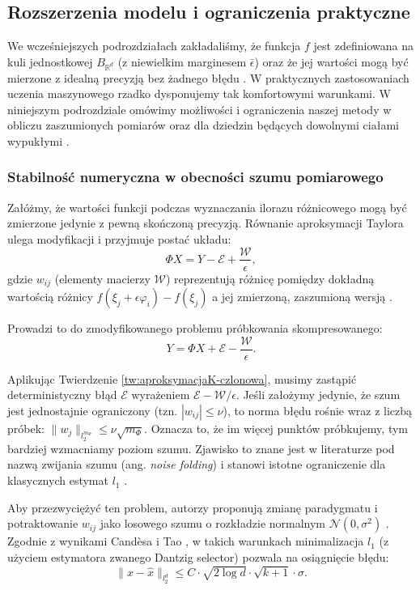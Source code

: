 \subsection{Rozszerzenia modelu i ograniczenia praktyczne}

We wcześniejszych podrozdziałach zakładaliśmy, że funkcja $f$ jest zdefiniowana na kuli jednostkowej $B_{\mathbb{R}^d}$ (z niewielkim marginesem $\bar{\epsilon}$) oraz że jej wartości mogą być mierzone z idealną precyzją bez żadnego błędu . W praktycznych zastosowaniach uczenia maszynowego rzadko dysponujemy tak komfortowymi warunkami. W niniejszym podrozdziale omówimy możliwości i ograniczenia naszej metody w obliczu zaszumionych pomiarów oraz dla dziedzin będących dowolnymi ciałami wypukłymi .

\subsubsection{Stabilność numeryczna w obecności szumu pomiarowego}

Załóżmy, że wartości funkcji podczas wyznaczania ilorazu różnicowego mogą być zmierzone jedynie z pewną skończoną precyzją. Równanie aproksymacji Taylora ulega modyfikacji i przyjmuje postać układu:
$$\Phi X = Y - \mathcal{E} + \frac{\mathcal{W}}{\epsilon},$$
gdzie $w_{ij}$ (elementy macierzy $\mathcal{W}$) reprezentują różnicę pomiędzy dokładną wartością różnicy $f(\xi_j+\epsilon\varphi_i) - f(\xi_j)$ a jej zmierzoną, zaszumioną wersją .

Prowadzi to do zmodyfikowanego problemu próbkowania skompresowanego:
$$Y = \Phi X + \mathcal{E} - \frac{\mathcal{W}}{\epsilon}.$$


Aplikując Twierdzenie \ref{tw:aproksymacjaK-czlonowa}, musimy zastąpić deterministyczny błąd $\mathcal{E}$ wyrażeniem $\mathcal{E} - \mathcal{W}/\epsilon$. Jeśli założymy jedynie, że szum jest jednostajnie ograniczony (tzn. $|w_{ij}| \le \nu$), to norma błędu rośnie wraz z liczbą próbek: $\|w_j\|_{l_2^{m_\Phi}} \le \nu\sqrt{m_\Phi}$. Oznacza to, że im więcej punktów próbkujemy, tym bardziej wzmacniamy poziom szumu. Zjawisko to znane jest w literaturze pod nazwą zwijania szumu (ang. \textit{noise folding}) i stanowi istotne ograniczenie dla klasycznych estymat $l_1$ \cite{fornasier2012learning} .

Aby przezwyciężyć ten problem, autorzy proponują zmianę paradygmatu i potraktowanie $w_{ij}$ jako losowego szumu o rozkładzie normalnym $\mathcal{N}(0, \sigma^2)$ . Zgodnie z wynikami Candèsa i Tao \cite{candes2007dantzig}, w takich warunkach minimalizacja $l_1$ (z użyciem estymatora zwanego Dantzig selector) pozwala na osiągnięcie błędu:
$$\|x - \hat{x}\|_{l_2^d} \le C \cdot \sqrt{2 \log d} \cdot \sqrt{k+1} \cdot \sigma.$$

